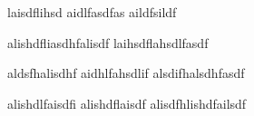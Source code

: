 


laisdflihsd
aidlfasdfas
aildfsildf

\begin{Parts}
\Part alishdfliasdhfalisdf
\Part laihsdflahsdlfasdf
\end{Parts}


aldsfhalisdhf
aidhlfahsdlif
alsdifhalsdhfasdf

\begin{Parts}
\Part alishdlfaisdfi
\Part alishdflaisdf
\Part alisdfhlishdfailsdf
\end{Parts}

